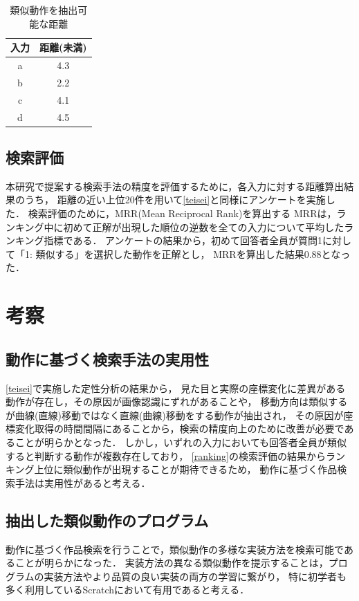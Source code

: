 \documentclass[twocolumn]{jarticle} %
\begin{document}
\begin{table}[H]
    \caption{類似動作を抽出可能な距離}
    \label{result}
    \centering
    \begin{tabular}{c|c}
    \hline
    入力 & 距離(未満) \\
    \hline \hline
    a & 4.3 \\
    \hline
    b & 2.2 \\
    \hline
    c & 4.1 \\
    \hline
    d & 4.5 \\
    \hline
    \end{tabular}
\end{table}

\subsection{検索評価}
本研究で提案する検索手法の精度を評価するために，各入力に対する距離算出結果のうち，
距離の近い上位20件を用いて\ref{teisei}と同様にアンケートを実施した．
検索評価のために，MRR(Mean Reciprocal Rank)を算出する
MRRは，ランキング中に初めて正解が出現した順位の逆数を全ての入力について平均したランキング指標である．
アンケートの結果から，初めて回答者全員が質問1に対して「1: 類似する」を選択した動作を正解とし，
MRRを算出した結果0.88となった．

\section{考察}
\subsection{動作に基づく検索手法の実用性}
\ref{teisei}で実施した定性分析の結果から，
見た目と実際の座標変化に差異がある動作が存在し，その原因が画像認識にずれがあることや，
移動方向は類似するが曲線(直線)移動ではなく直線(曲線)移動をする動作が抽出され，
その原因が座標変化取得の時間間隔にあることから，検索の精度向上のために改善が必要であることが明らかとなった．
しかし，いずれの入力においても回答者全員が類似すると判断する動作が複数存在しており，
\ref{ranking}の検索評価の結果からランキング上位に類似動作が出現することが期待できるため，
動作に基づく作品検索手法は実用性があると考える．

\subsection{抽出した類似動作のプログラム}
動作に基づく作品検索を行うことで，類似動作の多様な実装方法を検索可能であることが明らかになった．
実装方法の異なる類似動作を提示することは，プログラムの実装方法やより品質の良い実装の両方の学習に繋がり，
特に初学者も多く利用しているScratchにおいて有用であると考える．
\end{document}
